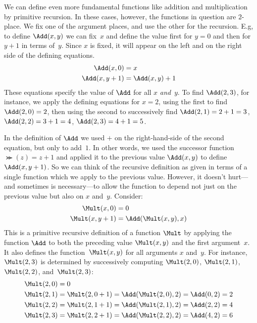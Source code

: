 \documentclass[../../../include/open-logic-section]{subfiles}
\begin{document}
We can define even more fundamental functions like addition and
multiplication by primitive recursion. In these cases, however, the
functions in question are $2$-place. We fix one of the argument
places, and use the other for the recursion. E.g, to define
$\Add(x, y)$ we can fix~$x$ and define the value first for $y=0$
and then for $y+1$ in terms of~$y$. Since $x$ is fixed, it will appear
on the left and on the right side of the defining equations.
\begin{align*}
\Add(x,0) & =  x\\
\Add(x,y+1) & =  \Add(x,y)+1
\end{align*}
These equations specify the value of $\Add$ for all $x$
\emph{and}~$y$. To find $\Add(2,3)$, for instance, we apply the
defining equations for $x = 2$, using the first to find
$\Add(2,0) = 2$, then using the second to successively find
$\Add(2,1) = 2 + 1 = 3$, $\Add(2, 2) = 3 + 1 = 4$, $\Add(2,
3) = 4 + 1 = 5$.

In the definition of $\Add$ we used $+$ on the right-hand-side of
the second equation, but only to add~$1$. In other words, we used the
successor function $\Succ(z) = z+1$ and applied it to the previous value
$\Add(x,y)$ to define $\Add(x,y+1)$. So we can think of the
recursive definition as given in terms of a single function which we
apply to the previous value. However, it doesn't hurt---and sometimes
is necessary---to allow the function to depend not just on the previous
value but also on $x$ and~$y$. Consider:
\begin{align*}
  \Mult(x,0) & =  0 \\
  \Mult(x,y+1) & =  \Add(\Mult(x,y),x)
\end{align*}
This is a primitive recursive definition of a function $\Mult$ by
applying the function $\Add$ to both the preceding value
$\Mult(x,y)$ and the first argument~$x$. It also defines the
function~$\Mult(x,y)$ for all arguments $x$ and~$y$. For instance,
$\Mult(2,3)$ is determined by successively computing $\Mult(2,0)$,
$\Mult(2,1)$, $\Mult(2,2)$, and~$\Mult(2,3)$:
\begin{align*}
  \Mult(2,0) & = 0\\
  \Mult(2,1) & = \Mult(2,0+1) =
  \Add(\Mult(2,0), 2) = \Add(0, 2) = 2\\
  \Mult(2,2) & = \Mult(2,1+1) =
  \Add(\Mult(2,1), 2) = \Add(2, 2) = 4\\
  \Mult(2,3) & = \Mult(2,2+1) =
  \Add(\Mult(2,2), 2) = \Add(4, 2) = 6
\end{align*}
\end{document}
